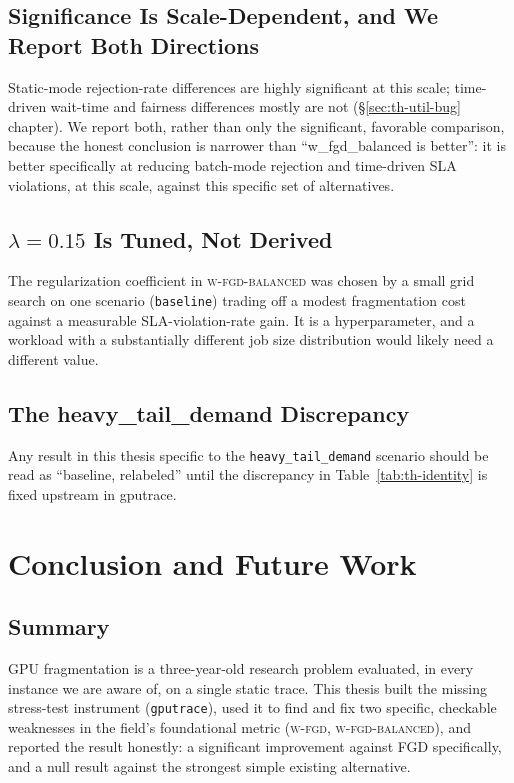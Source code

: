 \documentclass[12pt]{report}
\begin{document}
\section{Significance Is Scale-Dependent, and We Report Both Directions}
Static-mode rejection-rate differences are highly significant at this
scale; time-driven wait-time and fairness differences mostly are not
(\S\ref{sec:th-util-bug} chapter). We report both, rather than only the
significant, favorable comparison, because the honest conclusion is
narrower than ``w\_fgd\_balanced is better'': it is better specifically
at reducing batch-mode rejection and time-driven SLA violations, at this
scale, against this specific set of alternatives.

\section{$\lambda=0.15$ Is Tuned, Not Derived}
The regularization coefficient in \textsc{w-fgd-balanced} was chosen by a
small grid search on one scenario (\texttt{baseline}) trading off a
modest fragmentation cost against a measurable SLA-violation-rate gain.
It is a hyperparameter, and a workload with a substantially different job
size distribution would likely need a different value.

\section{The heavy\_tail\_demand Discrepancy}
Any result in this thesis specific to the \texttt{heavy\_tail\_demand}
scenario should be read as ``baseline, relabeled'' until the discrepancy
in Table~\ref{tab:th-identity} is fixed upstream in gputrace.

\chapter{Conclusion and Future Work}
\label{ch:conclusion}

\section{Summary}
GPU fragmentation is a three-year-old research problem evaluated, in
every instance we are aware of, on a single static trace. This thesis
built the missing stress-test instrument (\texttt{gputrace}), used it to
find and fix two specific, checkable weaknesses in the field's
foundational metric (\textsc{w-fgd}, \textsc{w-fgd-balanced}), and
reported the result honestly: a significant improvement against FGD
specifically, and a null result against the strongest simple existing
alternative.
\end{document}
